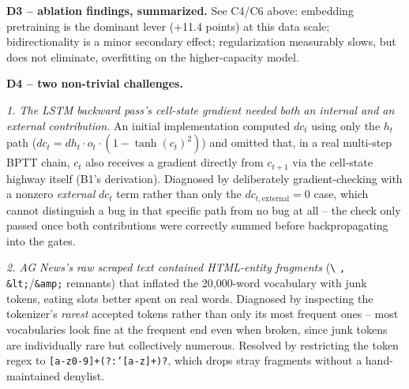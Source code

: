 \documentclass[11pt,a4paper]{article}
\begin{document}
\textbf{D3 -- ablation findings, summarized.} See C4/C6 above: embedding pretraining is the
dominant lever (+11.4 points) at this data scale; bidirectionality is a minor secondary
effect; regularization measurably slows, but does not eliminate, overfitting on the
higher-capacity model.

\textbf{D4 -- two non-trivial challenges.}

\emph{1. The LSTM backward pass's cell-state gradient needed both an internal and an
external contribution.} An initial implementation computed $dc_t$ using only the $h_t$ path
($dc_t = dh_t \cdot o_t \cdot (1-\tanh(c_t)^2)$) and omitted that, in a real multi-step BPTT
chain, $c_t$ also receives a gradient directly from $c_{t+1}$ via the cell-state highway
itself (B1's derivation). Diagnosed by deliberately gradient-checking with a nonzero
\emph{external} $dc_t$ term rather than only the $dc_{t,\text{external}}{=}0$ case, which
cannot distinguish a bug in that specific path from no bug at all -- the check only passed
once both contributions were correctly summed before backpropagating into the gates.

\emph{2. AG News's raw scraped text contained HTML-entity fragments} (\texttt{\textbackslash}
\texttt{,} \texttt{\&lt;}/\texttt{\&amp;} remnants) that inflated the 20{,}000-word vocabulary
with junk tokens, eating slots better spent on real words. Diagnosed by inspecting the
tokenizer's \emph{rarest} accepted tokens rather than only its most frequent ones -- most
vocabularies look fine at the frequent end even when broken, since junk tokens are
individually rare but collectively numerous. Resolved by restricting the token regex to
\texttt{[a-z0-9]+(?:'[a-z]+)?}, which drops stray fragments without a hand-maintained
denylist.
\end{document}
